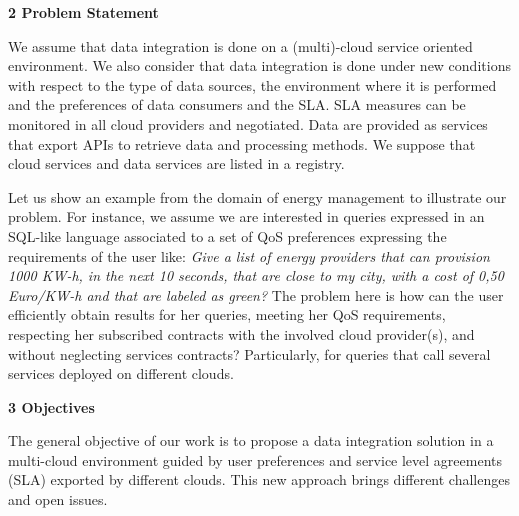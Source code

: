 \documentclass[12pt,a4paper,oneside]{report}
\begin{document}
\begin{flushleft}
\textbf{2 Problem Statement}\\
\end{flushleft}

We assume that data integration is done on a (multi)-cloud service oriented environment. We also consider that data integration is done under new conditions with respect to the type of data sources, the environment where it is performed and the preferences  of data consumers and the SLA. 
SLA measures can be monitored in all cloud providers and negotiated. Data are provided as services that export APIs to retrieve data and processing methods. 
We suppose that cloud services and data services are listed in a registry.

Let us show an example from the domain of energy management to illustrate our problem. 
For instance, we assume we are interested in queries expressed in an SQL-like language associated to a set of QoS preferences expressing the requirements of the user like: \textit{Give a list of energy providers that can provision 1000 KW-h, in the next 10 seconds, that are close to my city, with a cost of 0,50 Euro/KW-h and that are labeled as green?} The problem here is how can the user efficiently obtain results for her queries, meeting her QoS requirements, respecting her subscribed contracts with the involved cloud provider(s), and without neglecting services contracts? 
Particularly, for queries that call several services deployed on different clouds.


\begin{flushleft}
\textbf{3 Objectives}\\
\end{flushleft}

The general objective of our work is to propose a data integration solution in a multi-cloud environment guided by user preferences and service level agreements (SLA) exported by different clouds. This new approach brings different challenges and open issues. 
\end{document}
